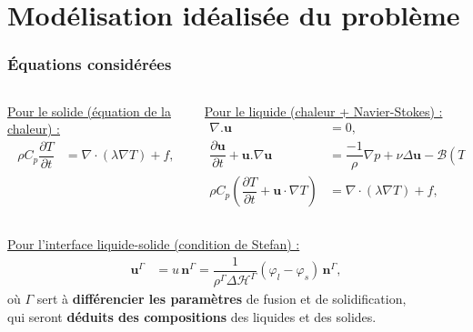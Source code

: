 \documentclass{beamer}
\newcommand{\vect}[1]{\bm{#1}}
\renewcommand{\frac}{\dfrac}
\begin{document}
\section{Modélisation idéalisée du problème}
\begin{frame}
    \frametitle{Équations considérées}
    \footnotesize

\begin{columns}[T]
    \begin{column}[T]{0.45\textwidth}
    \begin{center}
    \color{cea_rouge}\underline{Pour le solide (équation de la chaleur) :}\color{cea_texte}
    \begin{align*}
    	\rho C_p \frac{\partial T}{\partial t}  &=\nabla\cdot\left(\lambda \nabla T\right) + f,
    \end{align*}
        \end{center}
    \end{column}
    
    
    \begin{column}[T]{0.55\textwidth}
    \begin{center}
\color{cea_rouge}\underline{Pour le liquide (chaleur + Navier-Stokes) :} \color{cea_texte}
\begin{align*}
\nabla. \vect{u} &= 0,\\
\frac{ \partial \vect{u}}{\partial t} + \vect{u}.\nabla \vect{u} &= \frac{-1}{\rho} \nabla p + \nu \Delta \vect{u} - \mathcal{B}(T-T^{\text{ref}}) \vect{g} ,\\
\rho C_p (\frac{\partial T}{\partial t} + \vect{u} \cdot \nabla T ) &= \nabla\cdot\left(\lambda \nabla T\right) + f,
\end{align*}
    \end{center}
\end{column}
\end{columns}
\hspace{-1.8cm}
\begin{center}
\color{cea_rouge}\underline{Pour l'interface liquide-solide (condition de Stefan) :}\color{cea_texte}
\begin{align*}
	\vect{u}^\Gamma &= u \, \vect{n}^\Gamma = \frac{1}{\rho^{\Gamma} \Delta \mathcal{H}^{\Gamma}} (\varphi_l - \varphi_s) \, \vect{n}^\Gamma,
\end{align*}
où $\Gamma$ sert à \textbf{différencier les paramètres} de fusion et de solidification,\\
\vspace{0.3cm}
qui seront \textbf{déduits des  compositions} des liquides et des solides.
\end{center}
\vspace{0.1cm}
	\fbox{\begin{minipage}[]{\textwidth}
	\center\textcolor{red}{+ Fermetures à l'interface à définir}
	\end{minipage}}
\end{frame}
\end{document}
